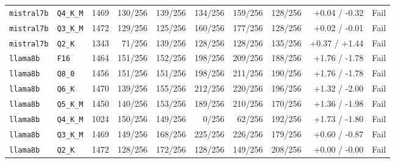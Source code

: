 {\begin{longtable}{@{}llrrrrrrrc@{}}
\texttt{mistral7b} & \texttt{Q4\_K\_M} & 1469 & 130/256 & 139/256 & 134/256 & 159/256 & 128/256 & +0.04 / -0.32 & Fail \\
\texttt{mistral7b} & \texttt{Q3\_K\_M} & 1472 & 129/256 & 125/256 & 160/256 & 177/256 & 128/256 & +0.02 / -0.01 & Fail \\
\texttt{mistral7b} & \texttt{Q2\_K} & 1343 & 71/256 & 139/256 & 128/256 & 128/256 & 135/256 & +0.37 / +1.44 & Fail \\
\texttt{llama8b} & \texttt{F16} & 1464 & 151/256 & 152/256 & 198/256 & 209/256 & 188/256 & +1.76 / -1.78 & Fail \\
\texttt{llama8b} & \texttt{Q8\_0} & 1456 & 151/256 & 151/256 & 198/256 & 211/256 & 190/256 & +1.76 / -1.78 & Fail \\
\texttt{llama8b} & \texttt{Q6\_K} & 1470 & 139/256 & 155/256 & 212/256 & 220/256 & 196/256 & +1.32 / -2.00 & Fail \\
\texttt{llama8b} & \texttt{Q5\_K\_M} & 1450 & 140/256 & 153/256 & 189/256 & 210/256 & 170/256 & +1.36 / -1.98 & Fail \\
\texttt{llama8b} & \texttt{Q4\_K\_M} & 1024 & 150/256 & 149/256 & 0/256 & 62/256 & 192/256 & +1.73 / -1.80 & Fail \\
\texttt{llama8b} & \texttt{Q3\_K\_M} & 1469 & 149/256 & 168/256 & 225/256 & 226/256 & 179/256 & +0.60 / -0.87 & Fail \\
\texttt{llama8b} & \texttt{Q2\_K} & 1472 & 128/256 & 172/256 & 128/256 & 149/256 & 208/256 & +0.00 / -0.00 & Fail \\
\end{longtable}
}